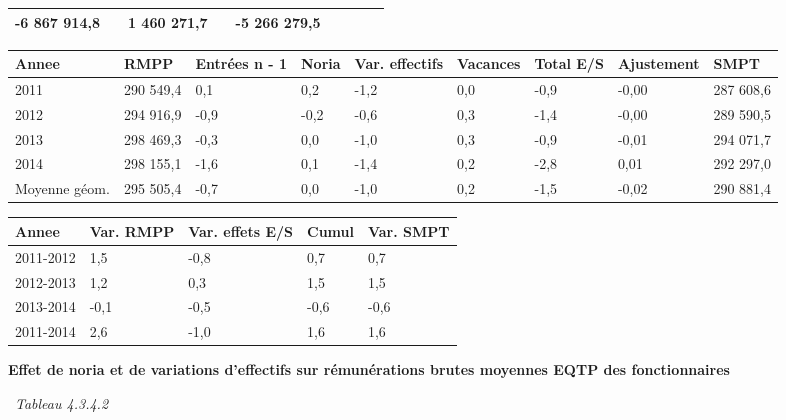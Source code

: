 \begin{longtable}[]{@{}lllllllll@{}}
\begin{minipage}[t]{0.16\columnwidth}
-6 867 914,8\strut
\end{minipage} & \begin{minipage}[t]{0.06\columnwidth}\raggedright
\strut
\end{minipage} & \begin{minipage}[t]{0.12\columnwidth}\raggedright
1 460 271,7\strut
\end{minipage} & \begin{minipage}[t]{0.06\columnwidth}\raggedright
\strut
\end{minipage} & \begin{minipage}[t]{0.10\columnwidth}\raggedright
-5 266 279,5\strut
\end{minipage} & \begin{minipage}[t]{0.06\columnwidth}\raggedright
\strut
\end{minipage}\tabularnewline
\bottomrule
\end{longtable}

\begin{longtable}[]{@{}lllllllll@{}}
\toprule
Annee & RMPP & Entrées n - 1 & Noria & Var. effectifs & Vacances & Total
E/S & Ajustement & SMPT\tabularnewline
\midrule
\endhead
2011 & 290 549,4 & 0,1 & 0,2 & -1,2 & 0,0 & -0,9 & -0,00 & 287
608,6\tabularnewline
2012 & 294 916,9 & -0,9 & -0,2 & -0,6 & 0,3 & -1,4 & -0,00 & 289
590,5\tabularnewline
2013 & 298 469,3 & -0,3 & 0,0 & -1,0 & 0,3 & -0,9 & -0,01 & 294
071,7\tabularnewline
2014 & 298 155,1 & -1,6 & 0,1 & -1,4 & 0,2 & -2,8 & 0,01 & 292
297,0\tabularnewline
Moyenne géom. & 295 505,4 & -0,7 & 0,0 & -1,0 & 0,2 & -1,5 & -0,02 & 290
881,4\tabularnewline
\bottomrule
\end{longtable}

\begin{longtable}[]{@{}lllll@{}}
\toprule
Annee & Var. RMPP & Var. effets E/S & Cumul & Var. SMPT\tabularnewline
\midrule
\endhead
2011-2012 & 1,5 & -0,8 & 0,7 & 0,7\tabularnewline
2012-2013 & 1,2 & 0,3 & 1,5 & 1,5\tabularnewline
2013-2014 & -0,1 & -0,5 & -0,6 & -0,6\tabularnewline
2011-2014 & 2,6 & -1,0 & 1,6 & 1,6\tabularnewline
\bottomrule
\end{longtable}

\textbf{Effet de noria et de variations d'effectifs sur rémunérations
brutes moyennes EQTP des fonctionnaires}

~\emph{Tableau 4.3.4.2}

